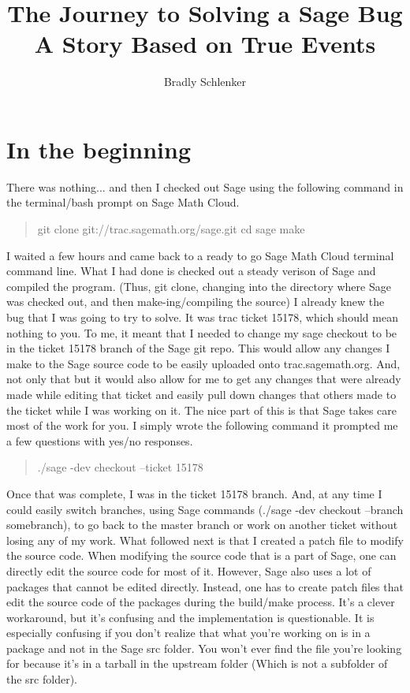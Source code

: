 \documentclass{article}
\title{The Journey to Solving a Sage Bug \\ A Story Based on True Events}
\author{Bradly Schlenker}
\begin{document}
\maketitle

\newpage
\section{In the beginning}
There was nothing... and then I checked out Sage using the following command in the terminal/bash prompt on Sage Math Cloud.
\begin{quote}
git clone git://trac.sagemath.org/sage.git \newline
cd sage \newline
make
\end{quote}
I waited a few hours and came back to a ready to go Sage Math Cloud terminal command line. What I had done is checked out a steady verison of Sage and compiled the program. (Thus, git clone, changing into the directory where Sage was checked out, and then make-ing/compiling the source) I already knew the bug that I was going to try to solve. It was trac ticket 15178, which should mean nothing to you. To me, it meant that I needed to change my sage checkout to be in the ticket 15178 branch of the Sage git repo. This would allow any changes I make to the Sage source code to be easily uploaded onto trac.sagemath.org. And, not only that but it would also allow for me to get any changes that were already made while editing that ticket and easily pull down changes that others made to the ticket while I was working on it. The nice part of this is that Sage takes care most of the work for you. I simply wrote the following command it prompted me a few questions with yes/no responses.

\begin{quote}
./sage -dev checkout --ticket 15178
\end{quote}

Once that was complete, I was in the ticket 15178 branch. And, at any time I could easily switch branches, using Sage commands (./sage -dev checkout --branch somebranch), to go back to the master branch or work on another ticket without losing any of my work. What followed next is that I created a patch file to modify the source code. When modifying the source code that is a part of Sage, one can directly edit the source code for most of it. However, Sage also uses a lot of packages that cannot be edited directly. Instead, one has to create patch files that edit the source code of the packages during the build/make process. It's a clever workaround, but it's confusing and the implementation is questionable. It is especially confusing if you don't realize that what you're working on is in a package and not in the Sage src folder. You won't ever find the file you're looking for because it's in a tarball in the upstream folder (Which is not a subfolder of the src folder).
\end{document}
